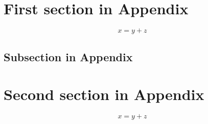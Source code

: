 \documentclass[12pt,green,palatino]{../bppaper}
\begin{document}
\section{First section in Appendix}

\blindtext 
\begin{equation}
x = y + z
\end{equation}
\blindtext 

\subsection{Subsection in Appendix}

\blindtext 

\section{Second section in Appendix}

\blindtext 
\begin{equation}
x = y + z
\end{equation}
\blindtext 

\end{document}
